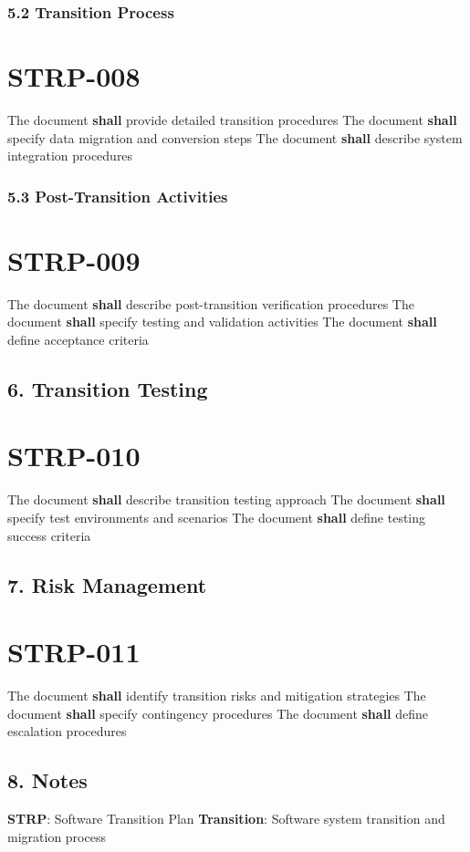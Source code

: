 \subsubsection{5.2 Transition Process}

\section{STRP-008}\label{STRP-008}

The document \textbf{shall} provide detailed transition procedures
The document \textbf{shall} specify data migration and conversion steps
The document \textbf{shall} describe system integration procedures

\subsubsection{5.3 Post-Transition Activities}

\section{STRP-009}\label{STRP-009}

The document \textbf{shall} describe post-transition verification procedures
The document \textbf{shall} specify testing and validation activities
The document \textbf{shall} define acceptance criteria

\subsection{6. Transition Testing}

\section{STRP-010}\label{STRP-010}

The document \textbf{shall} describe transition testing approach
The document \textbf{shall} specify test environments and scenarios
The document \textbf{shall} define testing success criteria

\subsection{7. Risk Management}

\section{STRP-011}\label{STRP-011}

The document \textbf{shall} identify transition risks and mitigation strategies
The document \textbf{shall} specify contingency procedures
The document \textbf{shall} define escalation procedures

\subsection{8. Notes}
\textbf{STRP}: Software Transition Plan
\textbf{Transition}: Software system transition and migration process

